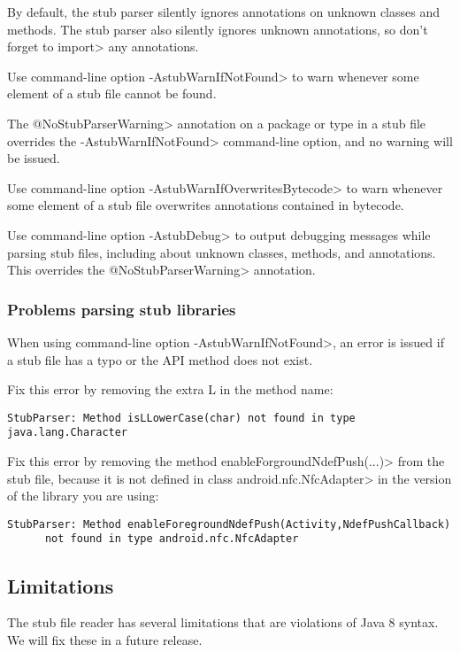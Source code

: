 By default, the stub parser silently ignores
annotations on unknown classes and methods.
The stub parser also silently ignores unknown annotations, so don't forget to
\<import> any annotations.

Use command-line option
\<-AstubWarnIfNotFound> to warn whenever some element of a stub file cannot
be found.

The \<@NoStubParserWarning> annotation on a package or type in a stub file
overrides the \<-AstubWarnIfNotFound> command-line option, and no warning
will be issued.

Use command-line option
\<-AstubWarnIfOverwritesBytecode> to warn whenever some element of a
stub file overwrites annotations contained in bytecode.

Use command-line option \<-AstubDebug> to output debugging messages while
parsing stub files, including about unknown classes, methods, and
annotations.  This overrides the \<@NoStubParserWarning> annotation.



\subsubsection{Problems parsing stub libraries}

When using command-line option \<-AstubWarnIfNotFound>,
an error is issued if a stub file has a typo or the API method does not
exist.

Fix this error by removing the extra L in the method name:
\begin{Verbatim}
StubParser: Method isLLowerCase(char) not found in type java.lang.Character
\end{Verbatim}

Fix this error by removing the method \<enableForgroundNdefPush(...)> from
the stub file, because it is not defined in class \<android.nfc.NfcAdapter>
in the version of the library you are using:
\begin{Verbatim}
StubParser: Method enableForegroundNdefPush(Activity,NdefPushCallback)
      not found in type android.nfc.NfcAdapter
\end{Verbatim}


\subsection{Limitations\label{stub-limitations}}

The stub file reader has several limitations that are violations of Java 8 syntax.  We will fix these in a
future release.

